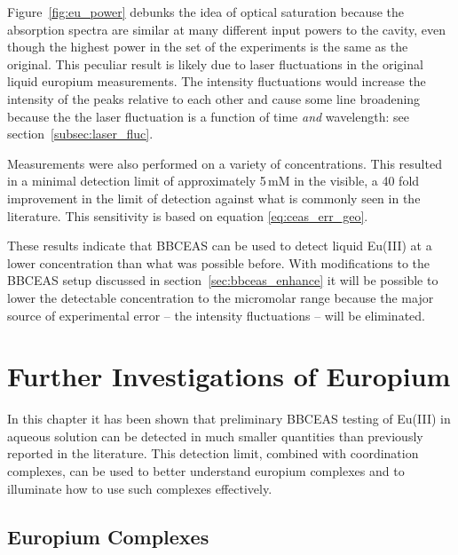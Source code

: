 Figure~\ref{fig:eu_power} debunks the idea of optical saturation because the
absorption spectra are similar at many different input powers to the cavity,
even though the highest power in the set of the experiments is the same as
the original. This peculiar result is likely due to laser fluctuations in
the original liquid europium measurements. The intensity fluctuations would
increase the intensity of the peaks relative to each other and cause some line
broadening because the the laser fluctuation is a function of time \emph{and}
wavelength: see section~\ref{subsec:laser_fluc}.

Measurements were also performed on a variety of concentrations. This resulted
in a minimal detection limit of approximately 5\,mM in the visible, a 40 fold
improvement in the limit of detection against what is commonly seen in the
literature. This sensitivity is based on equation \eqref{eq:ceas_err_geo}.

These results indicate that \ac{BBCEAS} can be used to detect liquid Eu(III)
at a lower concentration than what was possible before. With modifications to
the \ac{BBCEAS} setup discussed in section~\ref{sec:bbceas_enhance} it will be
possible to lower the detectable concentration to the micromolar range because
the major source of experimental error -- the intensity fluctuations -- will be eliminated.



\section{Further Investigations of Europium}\label{sec:eu_future}

In this chapter it has been shown that preliminary \ac{BBCEAS} testing of
Eu(III) in aqueous solution can be detected in much smaller quantities than
previously reported in the literature.  This detection limit, combined with
coordination complexes, can be used to better understand europium complexes and
to illuminate how to use such complexes effectively.



\subsection{Europium Complexes}\label{subsec:eu_complex}



